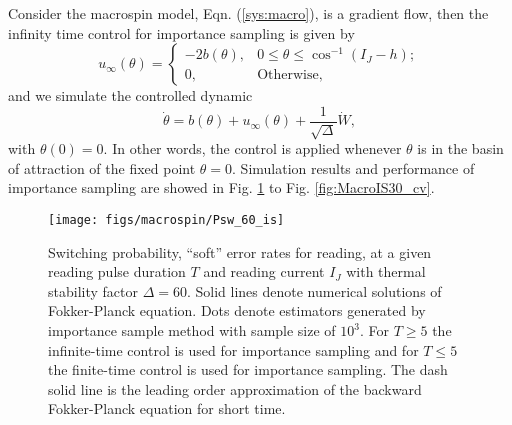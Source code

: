 \documentclass[journal,transmag]{IEEEtran}
\begin{document}
Consider the macrospin model, Eqn. (\ref{sys:macro}), is a gradient flow, then the infinity time control  for importance sampling is given by
%
\begin{equation} \label{control:u}
  u_\infty(\theta) = \begin{cases}
     -2b(\theta), & 0 \leqslant \theta \leqslant \cos^{-1}(I_J-h); \\
    0, & \text{Otherwise},
  \end{cases}
\end{equation}
%
and we simulate the controlled dynamic
 \begin{equation}
  \dot{\theta}  = b(\theta) +u_\infty(\theta) +  \frac{1}{ \sqrt{\Delta}} \dot{W},
 \end{equation}
with $\theta(0) = 0$. In other words, the control is applied whenever $\theta$ is in the basin of attraction of the fixed point $\theta = 0.$  Simulation results and performance of importance sampling are showed in Fig. \ref{fig:MacroIS60} to Fig. \ref{fig:MacroIS30_cv}.
\begin{figure}[H]
   \centering
         \texttt{[image: figs/macrospin/Psw\_60\_is]}
            \caption{Switching probability, ``soft'' error rates for reading,  at a given reading pulse duration $T$ and reading current $I_J$ with thermal stability factor $\Delta = 60.$ Solid lines denote numerical solutions of Fokker-Planck equation. Dots denote estimators generated by importance sample method with sample size of $10^3$. For $T \ge 5$ the infinite-time control is used for importance sampling and  for $T \le 5$ the finite-time control is used for importance sampling. The dash solid line is the leading order approximation of the backward Fokker-Planck equation for short time.}
   \label{fig:MacroIS60}
\end{figure}
%
%
\end{document}
